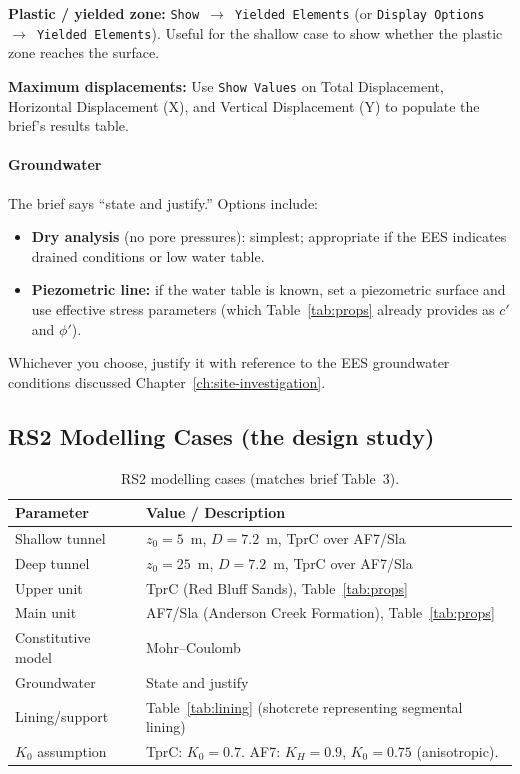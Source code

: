 \textbf{Plastic / yielded zone:} \texttt{Show $\to$ Yielded Elements} (or \texttt{Display Options $\to$ Yielded Elements}). Useful for the shallow case to show whether the plastic zone reaches the surface.

\textbf{Maximum displacements:} Use \texttt{Show Values} on Total Displacement, Horizontal Displacement (X), and Vertical Displacement (Y) to populate the brief's results table.

\paragraph{Groundwater}
The brief says ``state and justify.'' Options include:
\begin{itemize}
 \item \textbf{Dry analysis} (no pore pressures): simplest; appropriate if the EES indicates drained conditions or low water table.
 \item \textbf{Piezometric line:} if the water table is known, set a piezometric surface and use effective stress parameters (which Table~\ref{tab:props} already provides as $c'$ and $\phi'$).
\end{itemize}
Whichever you choose, justify it with reference to the EES groundwater conditions discussed Chapter~\ref{ch:site-investigation}.

\subsection{RS2 Modelling Cases (the design study)}

\begin{table}[h!]
\centering
\begin{tabular}{l l}
\toprule
\textbf{Parameter} & \textbf{Value / Description} \\
\midrule
Shallow tunnel & $z_0 = 5$~m, $D = 7.2$~m, TprC over AF7/Sla \\
Deep tunnel & $z_0 = 25$~m, $D = 7.2$~m, TprC over AF7/Sla \\
Upper unit & TprC (Red Bluff Sands), Table~\ref{tab:props} \\
Main unit & AF7/Sla (Anderson Creek Formation), Table~\ref{tab:props} \\
Constitutive model & Mohr--Coulomb \\
Groundwater & State and justify \\
Lining/support & Table~\ref{tab:lining} (shotcrete representing segmental lining) \\
$K_0$ assumption & TprC: $K_0 = 0.7$. AF7: $K_H = 0.9$, $K_0 = 0.75$ (anisotropic). \\
\bottomrule
\end{tabular}
\caption{RS2 modelling cases (matches brief Table~3).}
\label{tab:rs2_cases}
\end{table}

